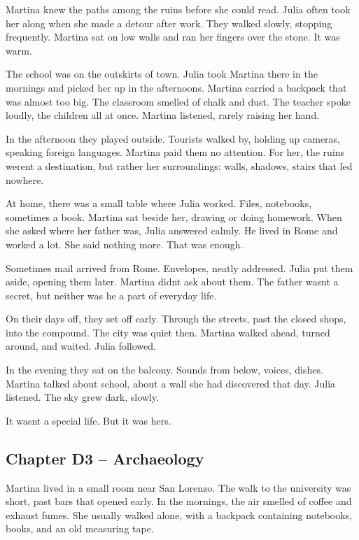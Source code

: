 \documentclass[
]{article}
\begin{document}
Martina knew the paths among the ruins before she could read. Julia often took her along when she made a detour after work. They walked slowly, stopping frequently. Martina sat on low walls and ran her fingers over the stone. It was warm.

The school was on the outskirts of town. Julia took Martina there in the mornings and picked her up in the afternoons. Martina carried a backpack that was almost too big. The classroom smelled of chalk and dust. The teacher spoke loudly, the children all at once. Martina listened, rarely raising her hand.

In the afternoon they played outside. Tourists walked by, holding up cameras, speaking foreign languages. Martina paid them no attention. For her, the ruins weren\textquotesingle t a destination, but rather her surroundings: walls, shadows, stairs that led nowhere.

At home, there was a small table where Julia worked. Files, notebooks, sometimes a book. Martina sat beside her, drawing or doing homework. When she asked where her father was, Julia answered calmly. He lived in Rome and worked a lot. She said nothing more. That was enough.

Sometimes mail arrived from Rome. Envelopes, neatly addressed. Julia put them aside, opening them later. Martina didn\textquotesingle t ask about them. The father wasn\textquotesingle t a secret, but neither was he a part of everyday life.

On their days off, they set off early. Through the streets, past the closed shops, into the compound. The city was quiet then. Martina walked ahead, turned around, and waited. Julia followed.

In the evening they sat on the balcony. Sounds from below, voices, dishes. Martina talked about school, about a wall she had discovered that day. Julia listened. The sky grew dark, slowly.

It wasn\textquotesingle t a special life. But it was hers.

\subsection{Chapter D3 -- Archaeology}\label{chapter-d3-archaeology}

Martina lived in a small room near San Lorenzo. The walk to the university was short, past bars that opened early. In the mornings, the air smelled of coffee and exhaust fumes. She usually walked alone, with a backpack containing notebooks, books, and an old measuring tape.
\end{document}
